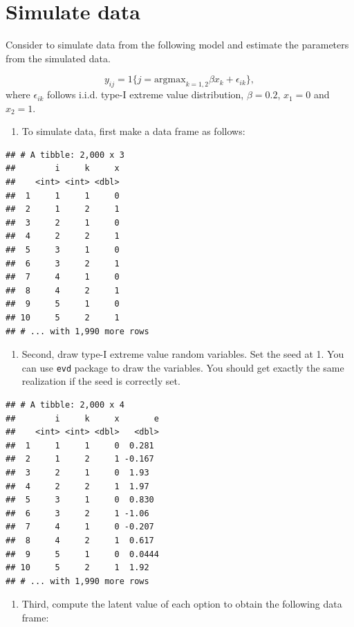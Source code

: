 \documentclass[]{book}
\providecommand{\tightlist}{%
  \setlength{\itemsep}{0pt}\setlength{\parskip}{0pt}}
\begin{document}
\section{Simulate data}\label{simulate-data}

Consider to simulate data from the following model and estimate the
parameters from the simulated data.

\[
y_{ij} = 1\{j = \text{argmax}_{k = 1, 2} \beta x_k + \epsilon_{ik} \},
\] where \(\epsilon_{ik}\) follows i.i.d. type-I extreme value
distribution, \(\beta = 0.2\), \(x_1 = 0\) and \(x_2 = 1\).

\begin{enumerate}
\def\labelenumi{\arabic{enumi}.}
\tightlist
\item
  To simulate data, first make a data frame as follows:
\end{enumerate}

\begin{verbatim}
## # A tibble: 2,000 x 3
##        i     k     x
##    <int> <int> <dbl>
##  1     1     1     0
##  2     1     2     1
##  3     2     1     0
##  4     2     2     1
##  5     3     1     0
##  6     3     2     1
##  7     4     1     0
##  8     4     2     1
##  9     5     1     0
## 10     5     2     1
## # ... with 1,990 more rows
\end{verbatim}

\begin{enumerate}
\def\labelenumi{\arabic{enumi}.}
\setcounter{enumi}{1}
\tightlist
\item
  Second, draw type-I extreme value random variables. Set the seed at 1.
  You can use \texttt{evd} package to draw the variables. You should get
  exactly the same realization if the seed is correctly set.
\end{enumerate}

\begin{verbatim}
## # A tibble: 2,000 x 4
##        i     k     x       e
##    <int> <int> <dbl>   <dbl>
##  1     1     1     0  0.281 
##  2     1     2     1 -0.167 
##  3     2     1     0  1.93  
##  4     2     2     1  1.97  
##  5     3     1     0  0.830 
##  6     3     2     1 -1.06  
##  7     4     1     0 -0.207 
##  8     4     2     1  0.617 
##  9     5     1     0  0.0444
## 10     5     2     1  1.92  
## # ... with 1,990 more rows
\end{verbatim}

\begin{enumerate}
\def\labelenumi{\arabic{enumi}.}
\setcounter{enumi}{2}
\tightlist
\item
  Third, compute the latent value of each option to obtain the following
  data frame:
\end{enumerate}
\end{document}
